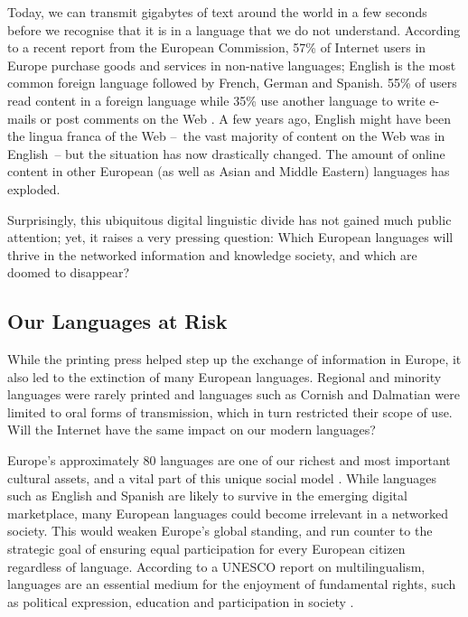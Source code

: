 \begin{multicols}{2}
Today, we can transmit gigabytes of text around the world in a few seconds before we recognise that it is in a language that we do not understand. According to a recent report from the European Commission, 57\% of Internet users in Europe purchase goods and services in non-native languages; English is the most common foreign language followed by French, German and Spanish. 55\% of users read content in a foreign language while 35\% use another language to write e-mails or post comments on the Web \cite{EC1}. A few years ago, English might have been the lingua franca of the Web --~the vast majority of content on the Web was in English~-- but the situation has now drastically changed. The amount of online content in other European (as well as Asian and Middle Eastern) languages has exploded.

Surprisingly, this ubiquitous digital linguistic divide has not gained much public attention; yet, it raises a very pressing question: Which European languages will thrive in the networked information and knowledge society, and which are doomed to disappear?

\subsection{Our Languages at Risk}

While the printing press helped step up the exchange of information in Europe, it also led to the extinction of many European languages. Regional and minority languages were rarely printed and languages such as Cornish and Dalmatian were limited to oral forms of transmission, which in turn restricted their scope of use. Will the Internet have the same impact on our modern languages?

Europe’s approximately 80 languages are one of our richest and most important cultural assets, and a vital part of this unique social model \cite{EC2}. While languages such as English and Spanish are likely to survive in the emerging digital marketplace, many European languages could become irrelevant in a networked society. This would weaken Europe’s global standing, and run counter to the strategic goal of ensuring equal participation for every European citizen regardless of language. According to a UNESCO report on multilingualism, languages are an essential medium for the enjoyment of fundamental rights, such as political expression, education and participation in society \cite{Unesco1}.



\end{multicols}
